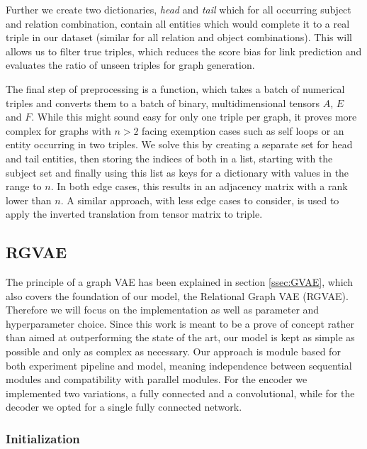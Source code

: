 Further we create two dictionaries, \textit{head} and \textit{tail} which for all occurring subject and relation combination, contain all entities which would complete it to a real triple in our dataset (similar for all relation and object combinations). This will allows us to filter true triples, which reduces the score bias for link prediction and evaluates the ratio of unseen triples for graph generation. 

The final step of preprocessing is a function, which takes a batch of numerical triples and converts them to a batch of binary, multidimensional tensors $A$, $E$ and $F$. While this might sound easy for only one triple per graph, it proves more complex for graphs with $n>2$ facing exemption cases such as self loops or an entity occurring in two triples. We solve this by creating a separate set for head and tail entities, then storing the indices of both in a list, starting with the subject set and finally using this list as keys for a dictionary with values in the range to $n$. In both edge cases, this results in an adjacency matrix with a rank lower than $n$. A similar approach, with less edge cases to consider, is used to apply the inverted translation from tensor matrix to triple.


\subsection{RGVAE}
The principle of a graph VAE has been explained in section \ref{ssec:GVAE}, which also covers the foundation of our model, the Relational Graph VAE (RGVAE). Therefore we will focus on the implementation as well as parameter and hyperparameter choice. Since this work is meant to be a prove of concept rather than aimed at outperforming the state of the art, our model is kept as simple as possible and only as complex as necessary. Our approach is module based for both experiment pipeline and model, meaning independence between sequential modules and compatibility with parallel modules. For the encoder we implemented two variations, a fully connected and a convolutional, while for the decoder we opted for a single fully connected network.

\subsubsection{Initialization}

